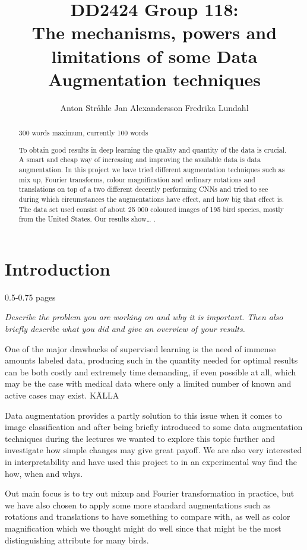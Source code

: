 \documentclass{article}
\title{DD2424 Group 118: \\ The mechanisms, powers and limitations of some Data Augmentation techniques}
\author{%
  Anton Stråhle \And Jan Alexandersson \And Fredrika Lundahl}
\begin{document}
	
\maketitle

\begin{abstract}

300 words maximum, currently 100 words

To obtain good results in deep learning the quality and quantity of the data is crucial. A smart and cheap way of increasing and improving the available data is data augmentation. In this project we have tried different augmentation techniques such as mix up, Fourier transforms, colour magnification and ordinary rotations and translations on top of a two different decently performing CNNs and tried to see during which circumstances the augmentations have effect, and how big that effect is. The data set used consist of about 25 000 coloured images of 195 bird species, mostly from the United States.  Our results show… .


\end{abstract}

\section{Introduction}

0.5-0.75 pages

\textit{Describe the problem you are working on and why it is important. Then also briefly describe what you did and give an overview of your results.}

One of the major drawbacks of supervised learning is the need of immense amounts labeled data, producing such in the quantity needed for optimal results can be both costly and extremely time demanding, if even possible at all, which may be the case with medical data where only a limited number of known and active cases may exist.  KÄLLA

Data augmentation provides a partly solution to this issue when it comes to image classification and after being briefly introduced to some data augmentation techniques during the lectures we wanted to explore this topic further and investigate how simple changes may give great payoff. We are also very interested in interpretability and have used this project to in an experimental way find the how, when and whys. 

Out main focus is to try out mixup and Fourier transformation in practice, but we have also chosen to apply some more standard augmentations such as rotations and translations to have something to compare with, as well as color magnification which we thought might do well since that might be the most distinguishing attribute for many birds.
\end{document}

